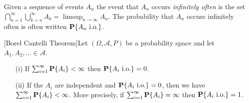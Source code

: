 \begin{defn}Given a sequence of events $A_n$ the event that $A_n$
  occurs \emph{infinitely often} is the set $\bigcap_{n=1}^\infty
  \bigcup_{k=n}^\infty A_k = \limsup_{n \to \infty} A_n$.  The
  probability that $A_n$ occurs infinitely often is often written $\textbf{P}\{A_n \text{ i.o.}\}$.
\end{defn}

\begin{thm}\label{BorelCantelli}[Borel Cantelli Theorem]Let
  $(\Omega,\mathcal{A},P)$ be a probability space and let $A_1, A_2,
  \dots \in \mathcal{A}$.
 \begin{itemize}
\item[(i)] If $\sum_{i=1}^\infty \textbf{P}\{A_i\} < \infty$
  then $\textbf{P}\{A_i \text{ i.o.}\} = 0$.  
\item[(ii)]If the $A_i$ are
  independent and $\textbf{P}\{A_i \text{ i.o.}\} = 0$, then we have
  $\sum_{i=1}^\infty \textbf{P}\{A_i\} < \infty$.  More precisely, if
  $\sum_{i=1}^\infty \textbf{P}\{A_i\} = \infty$ then $\textbf{P}\{A_i \text{ i.o.}\} = 1$.
\end{itemize}
\end{thm}
